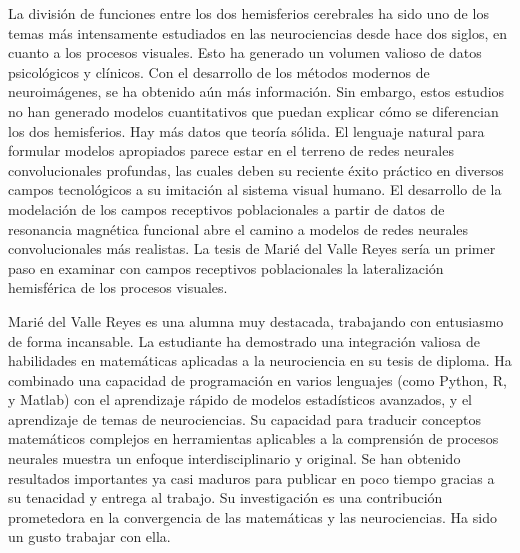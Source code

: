 \begin{opinion}
    La división de funciones entre los dos hemisferios cerebrales ha sido uno de los temas más intensamente estudiados en las neurociencias desde hace dos siglos, en cuanto a los procesos visuales. Esto ha generado un volumen valioso de datos psicológicos y clínicos. Con el desarrollo de los métodos modernos de neuroimágenes, se ha obtenido aún más información. Sin embargo, estos estudios no han generado modelos cuantitativos que puedan explicar cómo se diferencian los dos hemisferios. Hay más datos que teoría sólida. El lenguaje natural para formular modelos apropiados parece estar en el terreno de redes neurales convolucionales profundas, las cuales deben su reciente éxito práctico en diversos campos tecnológicos a su imitación al sistema visual humano. El desarrollo de la modelación de los campos receptivos poblacionales a partir de datos de resonancia magnética funcional abre el camino a modelos de redes neurales convolucionales m\'as realistas.  La tesis de Mari\'e del Valle Reyes sería un primer paso en examinar con campos receptivos poblacionales la lateralización hemisférica de los procesos visuales.
    
    Mari\'e del Valle Reyes es una alumna muy destacada, trabajando con entusiasmo de forma incansable. La estudiante ha demostrado una integración valiosa de habilidades en matemáticas aplicadas a la neurociencia en su tesis de diploma. Ha combinado una capacidad de programación en varios lenguajes (como Python, R, y Matlab) con el aprendizaje rápido de modelos estadísticos avanzados, y el aprendizaje de temas de neurociencias. Su capacidad para traducir conceptos matemáticos complejos en herramientas aplicables a la comprensión de procesos neurales muestra un enfoque interdisciplinario y original. Se han obtenido resultados importantes ya casi maduros para publicar en poco tiempo gracias a su tenacidad y entrega al trabajo. Su investigación es una contribución prometedora en la convergencia de las matemáticas y las neurociencias. Ha sido un gusto trabajar con ella.
\end{opinion}